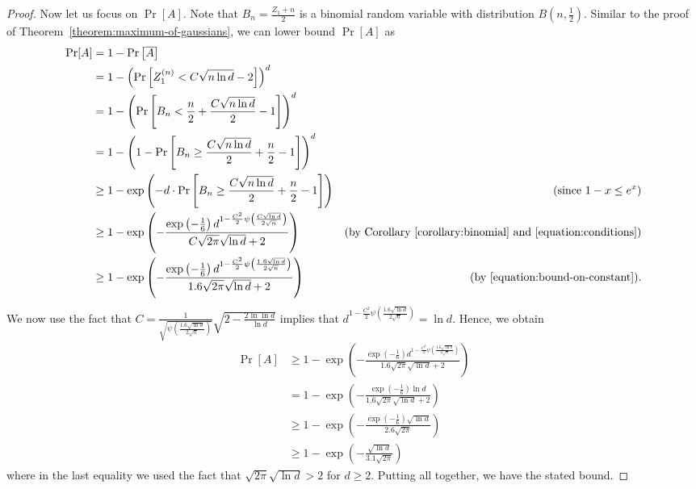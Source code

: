 \documentclass{article}
\begin{document}
\begin{proof}
Now let us focus on $\Pr[A]$. Note that $B_n = \frac{Z_1 + n}{2}$ is a binomial random variable with distribution $B(n,\frac{1}{2})$.
Similar to the proof of Theorem~\ref{theorem:maximum-of-gaussians}, we can lower bound $\Pr[A]$ as
\begin{align*}
\Pr[A]
& = 1 - \Pr \left[ \overline{A} \right] \\
& = 1 - \left(\Pr \left[ Z^{(n)}_1 < C \sqrt{n \ln d} - 2 \right] \right)^d \\
& = 1 - \left(\Pr \left[ B_n < \frac{n}{2} + \frac{C \sqrt{n \ln d}}{2} - 1 \right] \right)^d \\
& = 1 - \left(1 - \Pr\left[B_n \ge \frac{C \sqrt{n \ln d}}{2} +\frac{n}{2} - 1 \right] \right)^d \\
& \ge 1 - \exp\left(-d \cdot \Pr \left[ B_n \ge \frac{C \sqrt{n \ln d}}{2} +\frac{n}{2} - 1 \right] \right) & \text{(since $1 - x \le e^x$)} \\
& \ge 1 - \exp\left(-\frac{\exp\left(-\frac{1}{6}\right) d^{1-\frac{C^2}{2} \psi\left(\frac{C \sqrt{\ln d}}{2 \sqrt{n}}\right)}}{C \sqrt{2\pi} \sqrt{\ln d}+2}\right) & \text{(by Corollary \ref{corollary:binomial} and \eqref{equation:conditions})} \\
& \ge 1 - \exp\left(-\frac{\exp\left(-\frac{1}{6}\right) d^{1-\frac{C^2}{2} \psi\left(\frac{1.6 \sqrt{\ln d}}{2 \sqrt{n}}\right)}}{1.6 \sqrt{2\pi} \sqrt{\ln d}+2}\right) & \text{(by \eqref{equation:bound-on-constant}).}
\end{align*}
We now use the fact that $C=\frac{1}{\sqrt{\psi\left(\frac{1.6 \sqrt{\ln d}}{2 \sqrt{n}}\right)}}\sqrt{2- \frac{2\ln \ln d}{\ln d}}$ implies that $d^{1-\frac{C^2}{2} \psi\left(\frac{1.6 \sqrt{\ln d}}{2 \sqrt{n}}\right)}=\ln d$. Hence, we obtain
\begin{align*}
\Pr[A]
& \ge 1 - \exp\left(-\frac{\exp\left(-\frac{1}{6}\right) d^{1-\frac{C^2}{2} \psi\left(\frac{1.6 \sqrt{\ln d}}{2 \sqrt{n}}\right)}}{1.6 \sqrt{2\pi} \sqrt{\ln d}+2}\right) \\
& = 1 - \exp\left(-\frac{\exp\left(-\frac{1}{6}\right) \ln d}{1.6 \sqrt{2\pi} \sqrt{\ln d}+2}\right) \\
& \ge 1 - \exp\left(-\frac{\exp\left(-\frac{1}{6}\right) \sqrt{\ln d}}{2.6 \sqrt{2\pi}}\right)\\
& \ge 1 - \exp\left(-\frac{\sqrt{\ln d}}{3.1 \sqrt{2\pi}}\right)
\end{align*}
where in the last equality we used the fact that $\sqrt{2\pi} \sqrt{\ln d} > 2$ for $d\ge 2$. Putting all together, we have the stated bound.
\end{proof}
\end{document}
